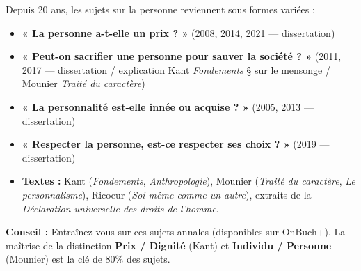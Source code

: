 \documentclass[11pt]{article}
\begin{document}
\begin{savaistu}
Depuis 20 ans, les sujets sur la personne reviennent sous formes variées :
\begin{itemize}
    \item \textbf{« La personne a-t-elle un prix ? »} (2008, 2014, 2021 — dissertation)
    \item \textbf{« Peut-on sacrifier une personne pour sauver la société ? »} (2011, 2017 — dissertation / explication Kant \emph{Fondements} § sur le mensonge / Mounier \emph{Traité du caractère})
    \item \textbf{« La personnalité est-elle innée ou acquise ? »} (2005, 2013 — dissertation)
    \item \textbf{« Respecter la personne, est-ce respecter ses choix ? »} (2019 — dissertation)
    \item \textbf{Textes :} Kant (\emph{Fondements}, \emph{Anthropologie}), Mounier (\emph{Traité du caractère}, \emph{Le personnalisme}), Ricoeur (\emph{Soi-même comme un autre}), extraits de la \emph{Déclaration universelle des droits de l'homme}.
\end{itemize}
\textbf{Conseil :} Entraînez-vous sur ces sujets annales (disponibles sur OnBuch+). La maîtrise de la distinction \textbf{Prix / Dignité} (Kant) et \textbf{Individu / Personne} (Mounier) est la clé de 80\% des sujets.
\end{savaistu}
\end{document}

